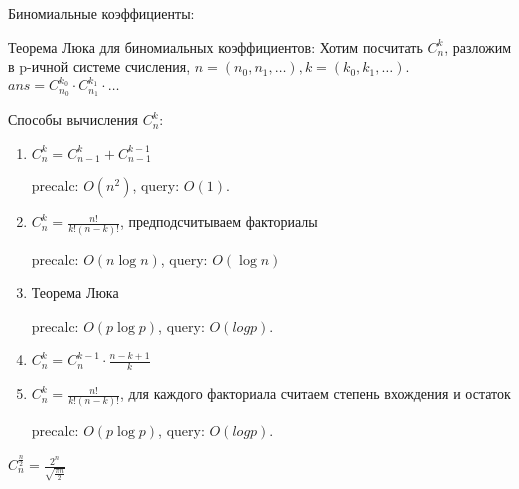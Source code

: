 Биномиальные коэффициенты:

Теорема Люка для биномиальных коэффициентов:
Хотим посчитать $C_n^k$, разложим в p-ичной системе счисления, 
$n = (n_0, n_1, \dots), k = (k_0, k_1, \dots)$.
$ans = C_{n_0} ^ {k_0} \cdot C_{n_1}^{k_1} \cdot \dots$

Способы вычисления $C_n^k$:
\begin{enumerate}
	\item
	$C_n^k = C_{n-1}^k + C_{n-1}^{k-1}$
	
	precalc: $O(n^2)$, query: $O(1)$.
	
	\item
	$C_n^k = \frac{n!}{k!(n - k)!}$, предподсчитываем факториалы
    
    precalc: $O(n \log n)$, query: $O(\log n)$
	
	\item
	Теорема Люка
    
    precalc: $O(p \log p)$, query: $O(log p)$.
	
	\item
	$C_n^k = C_n^{k-1} \cdot \frac{n - k + 1}{k}$

	\item
	$C_n^k = \frac{n!}{k!(n - k)!}$, для каждого факториала считаем степень вхождения и остаток
	
	precalc: $O(p \log p)$, query: $O(log p)$.

\end{enumerate}

$C_n^{\frac{n}{2}} = \frac{2^n}{\sqrt{\frac{\pi n}{2}}}$

